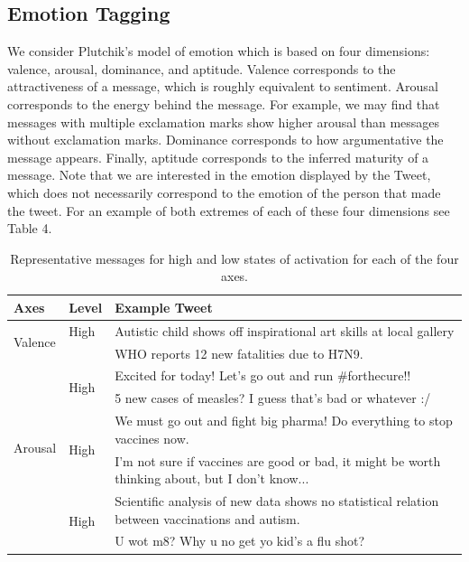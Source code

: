 \subsection{Emotion Tagging}

We consider Plutchik's model of emotion \cite{plutchik2001nature} which is based on four dimensions: valence, arousal, dominance, and aptitude. Valence corresponds to the attractiveness of a message, which is roughly equivalent to sentiment. Arousal corresponds to the energy behind the message. For example, we may find that messages with multiple exclamation marks show higher arousal than messages without exclamation marks. Dominance corresponds to how argumentative the message appears. Finally, aptitude corresponds to the inferred maturity of a message. Note that we are interested in the emotion displayed by the Tweet, which does not necessarily correspond to the emotion of the person that made the tweet. For an example of both extremes of each of these four dimensions see Table 4.

\begin{table}[t]
  \centering
\begin{tabular}{|l|l|p{8cm}|}
  \hline
  Axes & Level & Example Tweet     \\ \hline
 \multirow{3}{*}{Valence} & \multirow{2}{*}{High} & Autistic child shows off inspirational art skills at local gallery \\ \cline{2-3}
   & \multirow{2}{*}{Low} & \multirow{2}{*}{WHO reports 12 new fatalities due to H7N9.}  \\ & & \\ \hline
 \multirow{5}{*}{Arousal} & \multirow{2}{*}{High} & Excited for today! Let's go out and run \#forthecure!! \\ \cline{2-3}
   & \multirow{2}{*}{Low} & 5 new cases of measles? I guess that's bad or whatever :/   \\ \hline
\multirow{5}{*}{Dominance} & \multirow{2}{*}{High} & \rule{0pt}{2ex}We must go out and fight big pharma! Do everything to stop vaccines now.\\ \cline{2-3}
  & \multirow{2}{*}{Low} & I'm not sure if vaccines are good or bad, it might be worth thinking about, but I don't know...  \\ \hline
 \multirow{3}{*}{Aptitude} & \multirow{2}{*}{High} & Scientific analysis of new data shows no statistical relation between vaccinations and autism.\\ \cline{2-3}
   & \multirow{1}{*}{Low} & U wot m8? Why u no get yo kid's a flu shot? \\ \hline
\end{tabular}
\label{tab:act_example_axes}
\caption{Representative messages for high and low states of activation for each of the four axes.}%
\end{table}


